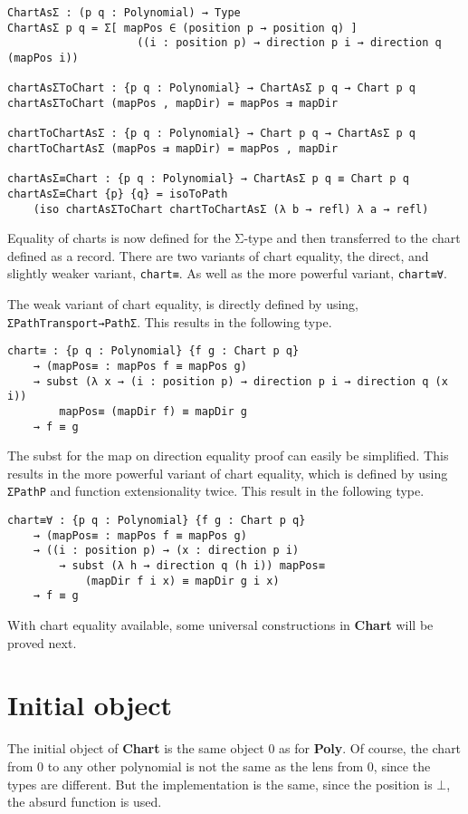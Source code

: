 \begin{verbatim}
ChartAsΣ : (p q : Polynomial) → Type
ChartAsΣ p q = Σ[ mapPos ∈ (position p → position q) ]
                    ((i : position p) → direction p i → direction q (mapPos i))

chartAsΣToChart : {p q : Polynomial} → ChartAsΣ p q → Chart p q
chartAsΣToChart (mapPos , mapDir) = mapPos ⇉ mapDir

chartToChartAsΣ : {p q : Polynomial} → Chart p q → ChartAsΣ p q
chartToChartAsΣ (mapPos ⇉ mapDir) = mapPos , mapDir

chartAsΣ≡Chart : {p q : Polynomial} → ChartAsΣ p q ≡ Chart p q
chartAsΣ≡Chart {p} {q} = isoToPath 
    (iso chartAsΣToChart chartToChartAsΣ (λ b → refl) λ a → refl)
\end{verbatim}

Equality of charts is now defined for the Σ-type and then transferred to the chart defined as a record. There are two variants of chart equality, the direct, and slightly weaker variant, \texttt{chart≡}. As well as the more powerful variant, \texttt{chart≡∀}.

The weak variant of chart equality, is directly defined by using, \texttt{ΣPathTransport→PathΣ}. This results in the following type.

\begin{verbatim}
chart≡ : {p q : Polynomial} {f g : Chart p q}
    → (mapPos≡ : mapPos f ≡ mapPos g)
    → subst (λ x → (i : position p) → direction p i → direction q (x i))
        mapPos≡ (mapDir f) ≡ mapDir g
    → f ≡ g
\end{verbatim}

The subst for the map on direction equality proof can easily be simplified. This results in the more powerful variant of chart equality, which is defined by using \texttt{ΣPathP} and function extensionality twice. This result in the following type.
\begin{verbatim}
chart≡∀ : {p q : Polynomial} {f g : Chart p q}
    → (mapPos≡ : mapPos f ≡ mapPos g)
    → ((i : position p) → (x : direction p i) 
        → subst (λ h → direction q (h i)) mapPos≡ 
            (mapDir f i x) ≡ mapDir g i x)
    → f ≡ g
\end{verbatim}


With chart equality available, some universal constructions in \textbf{Chart} will be proved next. 


\section{Initial object}
The initial object of \textbf{Chart} is the same object 0 as for \textbf{Poly}. Of course, the chart from $0$ to any other polynomial is not the same as the lens from $0$, since the types are different. But the implementation is the same, since the position is $\bot$, the absurd function is used.

